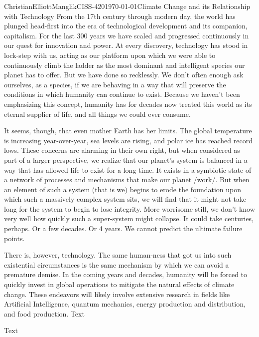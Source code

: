 \documentclass[12pt,letterpaper]{article}
\begin{document}
\begin{mla}{Christian}{Elliott}{Manglik}{CISS-420}{\today}{Climate Change and its Relationship with Technology}
  From the 17th century through modern day, the world has plunged head-first
into the era of technological development and its companion, capitalism. For
the last 300 years we have scaled and progressed continuously in our quest
for innovation and power. At every discovery, technology has stood in lock-step
with us, acting as our platform upon which we were able to continuously climb
the ladder as the most dominant and intelligent species our planet has to offer.
But we have done so recklessly. We don't often enough ask ourselves, as a
species, if we are behaving in a way that will preserve the conditions in which
humanity can continue to exist. Because we haven't been emphasizing this
concept, humanity has for decades now treated this world as its eternal supplier
of life, and all things we could ever consume.

It seems, though, that even mother Earth has her limits. The global temperature
is increasing year-over-year, sea levels are rising, and polar ice has reached
record lows. These concerns are alarming in their own right, but when considered
as part of a larger perspective, we realize that our planet's system is balanced
in a way that has allowed life to exist for a long time. It exists in a
symbiotic state of a network of processes and mechanisms that make our planet
/work/. But when an element of such a system (that is we) begins to erode the
foundation upon which such a massively complex system sits, we will find that
it might not take long for the system to begin to lose integrity. More worrisome
still, we don't know very well how quickly such a super-system might collapse.
It could take centuries, perhaps. Or a few decades. Or 4 years. We cannot
predict the ultimate failure points.

There is, however, technology. The same human-ness that got us into such
existential circumstances is the same mechanism by which we can avoid a
premature demise. In the coming years and decades, humanity will be forced to
quickly invest in global operations to mitigate the natural effects of climate
change. These endeavors will likely involve extensive research in fields like
Artificial Intelligence, quantum mechanics, energy production and distribution,
and food production. Text \autocite[55]{barrett09aa}

Text

\printbibliography
\end{mla}
\end{document}
